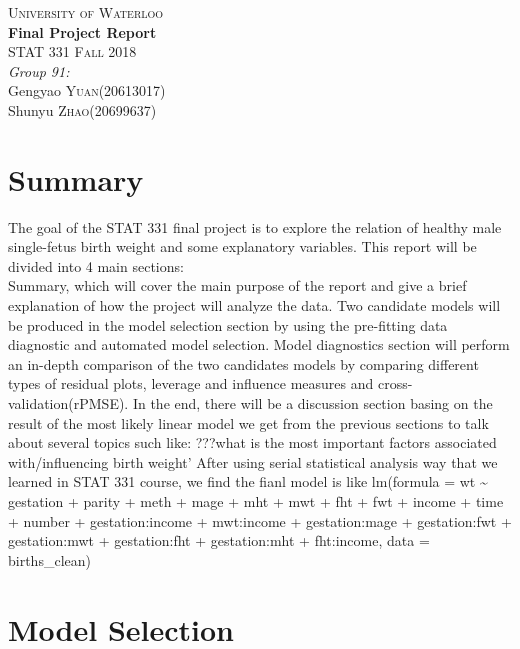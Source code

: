 \documentclass[]{article}
\title{}
\author{}
\date{}
\begin{document}
\begin{titlepage}

\center
\textsc{\LARGE University of Waterloo}\\[5cm]
{ \huge \bfseries Final Project Report}\\[4cm]
     \textsc{\Large STAT 331 Fall 2018}\\[3cm]
     
\emph{Group 91:}\\[0.5cm]
Gengyao \textsc{Yuan}(20613017)\\[0.5cm]
Shunyu \textsc{Zhao}(20699637)


\end{titlepage}

\tableofcontents

\newpage

\section{Summary}

The goal of the STAT 331 final project is to explore the relation of
healthy male single-fetus birth weight and some explanatory variables.
This report will be divided into 4 main sections:\\
Summary, which will cover the main purpose of the report and give a
brief explanation of how the project will analyze the data. Two
candidate models will be produced in the model selection section by
using the pre-fitting data diagnostic and automated model selection.
Model diagnostics section will perform an in-depth comparison of the two
candidates models by comparing different types of residual plots,
leverage and influence measures and cross-validation(rPMSE). In the end,
there will be a discussion section basing on the result of the most
likely linear model we get from the previous sections to talk about
several topics such like: ???what is the most important factors
associated with/influencing birth weight' After using serial statistical
analysis way that we learned in STAT 331 course, we find the fianl model
is like lm(formula = wt \textasciitilde{} gestation + parity + meth +
mage + mht + mwt + fht + fwt + income + time + number + gestation:income
+ mwt:income + gestation:mage + gestation:fwt + gestation:mwt +
gestation:fht + gestation:mht + fht:income, data = births\_clean)

\section{Model Selection}
\end{document}
